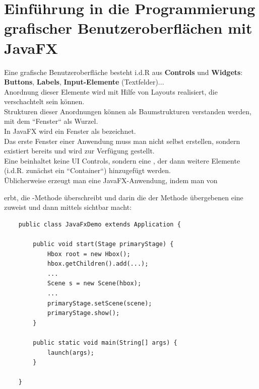 \section{Einführung in die Programmierung grafischer Benutzeroberflächen mit JavaFX}


Eine grafische Benutzeroberfläche besteht i.d.R aus \textbf{Controls} und \textbf{Widgets}: \textbf{Buttons}, \textbf{Labels}, \textbf{Input-Elemente} (Textfelder)...\\

\noindent
Anordnung dieser Elemente wird mit Hilfe von Layouts realisiert, die verschachtelt sein können.\\

\noindent
Strukturen dieser Anordnungen können als Baumstrukturen verstanden werden, mit dem ``Fenster`` als Wurzel.\\

\noindent
In JavaFX wird ein Fenster als  bezeichnet.\\

\noindent
Das erste Fenster einer Anwendung muss man nicht selbst erstellen, sondern existiert bereits und wird zur Verfügung gestellt.\\

\noindent
Eine  beinhaltet keine UI Controls, sondern eine , der dann weitere Elemente (i.d.R. zunächst ein ``Container``) hinzugefügt werden.\\

\noindent
Üblicherweise erzeugt man eine JavaFX-Anwendung, indem man von \begin{center}\end{center} erbt, die -Methode überschreibt und darin die der Methode übergebenen  eine  zuweist und dann mittels  sichtbar macht:

\begin{verbatim}
    public class JavaFxDemo extends Application {

        public void start(Stage primaryStage) {
            Hbox root = new Hbox();
            hbox.getChildren().add(...);
            ...
            Scene s = new Scene(hbox);
            ...
            primaryStage.setScene(scene);
            primaryStage.show();
        }

        public static void main(String[] args) {
            launch(args);
        }

    }
\end{verbatim}

